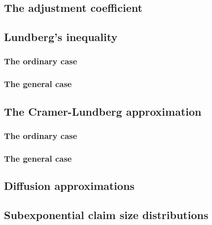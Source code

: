 \documentclass[a4paper,10pt,openany]{book}
\begin{document}
\hypertarget{the-adjustment-coefficient-1}{%
\subsection{The adjustment coefficient}\label{the-adjustment-coefficient-1}}

\hypertarget{lundbergs-inequality-1}{%
\subsection{Lundberg's inequality}\label{lundbergs-inequality-1}}

\hypertarget{the-ordinary-case}{%
\subsubsection{The ordinary case}\label{the-ordinary-case}}

\hypertarget{the-general-case}{%
\subsubsection{The general case}\label{the-general-case}}

\hypertarget{the-cramer-lundberg-approximation-1}{%
\subsection{The Cramer-Lundberg approximation}\label{the-cramer-lundberg-approximation-1}}

\hypertarget{the-ordinary-case-1}{%
\subsubsection{The ordinary case}\label{the-ordinary-case-1}}

\hypertarget{the-general-case-1}{%
\subsubsection{The general case}\label{the-general-case-1}}

\hypertarget{diffusion-approximations-1}{%
\subsection{Diffusion approximations}\label{diffusion-approximations-1}}

\hypertarget{subexponential-claim-size-distributions-1}{%
\subsection{Subexponential claim size distributions}\label{subexponential-claim-size-distributions-1}}
\end{document}
